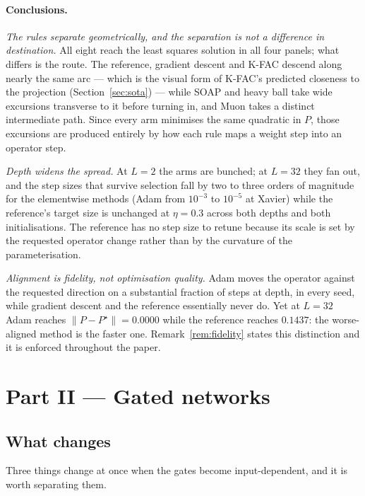 \documentclass{article} %
\theoremstyle{plain}
\theoremstyle{definition}
\theoremstyle{remark}
\begin{document}
\paragraph{Conclusions.}
\emph{The rules separate geometrically, and the separation is not a difference in destination.} All
eight reach the least squares solution in all four panels; what differs is the route. The reference,
gradient descent and K-FAC descend along nearly the same arc --- which is the visual form of K-FAC's
predicted closeness to the projection (Section~\ref{sec:sota}) --- while SOAP and heavy ball take
wide excursions transverse to it before turning in, and Muon takes a distinct intermediate path.
Since every arm minimises the same quadratic in $P$, those excursions are produced entirely by how
each rule maps a weight step into an operator step.

\emph{Depth widens the spread.} At $L=2$ the arms are bunched; at $L=32$ they fan out, and the
step sizes that survive selection fall by two to three orders of magnitude for the elementwise
methods (Adam from $10^{-3}$ to $10^{-5}$ at Xavier) while the reference's target size is unchanged
at $\eta = 0.3$ across both depths and both initialisations. The reference has no step size to
retune because its scale is set by the requested operator change rather than by the curvature of the
parameterisation.

\emph{Alignment is fidelity, not optimisation quality.} Adam moves the operator against the
requested direction on a substantial fraction of steps at depth, in every seed, while gradient
descent and the reference essentially never do. Yet at $L=32$ Adam reaches
$\|P - P^\star\| = 0.0000$ while the reference reaches $0.1437$: the worse-aligned method is the
faster one. Remark~\ref{rem:fidelity} states this distinction and it is enforced throughout the
paper.

\section{Part II --- Gated networks}
\label{sec:nonlinear}

\subsection{What changes}
\label{sec:whatchanges}

Three things change at once when the gates become input-dependent, and it is worth separating
them.
\end{document}
